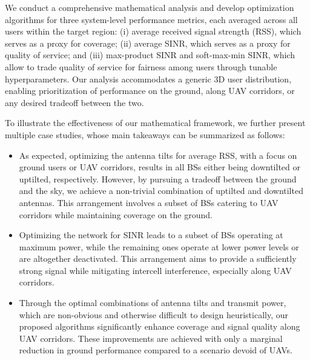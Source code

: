 We conduct a comprehensive mathematical analysis and develop optimization algorithms for three system-level performance metrics, each averaged across all users within the target region: (i) average received signal strength (RSS), which serves as a proxy for coverage; (ii) average SINR, which serves as a proxy for quality of service; and (iii) max-product SINR and soft-max-min SINR, which allow to trade quality of service for fairness among users through tunable hyperparameters. Our analysis accommodates a generic 3D user distribution, enabling prioritization of performance on the ground, along UAV corridors, or any desired tradeoff between the two.

To illustrate the effectiveness of our mathematical framework, we further present multiple case studies, whose main takeaways can be summarized as follows:
\begin{itemize}
    \item 
    As expected, optimizing the antenna tilts for average RSS, with a focus on ground users or UAV corridors, results in all BSs either being downtilted or uptilted, respectively. However, by pursuing a tradeoff between the ground and the sky, we achieve a non-trivial combination of uptilted and downtilted antennas. This arrangement involves a subset of BSs catering to UAV corridors while maintaining coverage on the ground.
    \item
    Optimizing the network for SINR leads to a subset of BSs operating at maximum power, while the remaining ones operate at lower power levels or are altogether deactivated. This arrangement aims to provide a sufficiently strong signal while mitigating intercell interference, especially along UAV corridors.
    \item 
    Through the optimal combinations of antenna tilts and transmit power, which are non-obvious and otherwise difficult to design heuristically, our proposed algorithms significantly enhance coverage and signal quality along UAV corridors. These improvements are achieved with only a marginal reduction in ground performance compared to a scenario devoid of UAVs.
\end{itemize}

